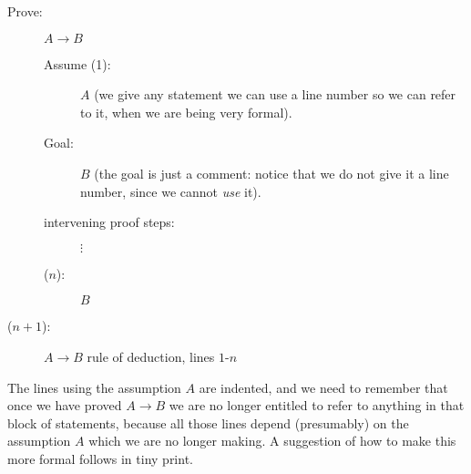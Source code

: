 \documentclass[12pt]{article}
\begin{document}
\begin{description}

\item[Prove:]  $A \rightarrow B$

\begin{description}

\item[Assume (1):]  $A$  (we give any statement we can use a line number so we can refer to it, when we are being very formal).

\item[Goal:]  $B$ (the goal is just a comment:  notice that we do not give it a line number, since we cannot {\em use\/} it).

\item[intervening proof steps:]  $\vdots$

\item[($n$):]  $B$

\end{description}

\item[($n+1$):]  $A \rightarrow B$ rule of deduction, lines $1$-$n$

\end{description}

The lines using the assumption $A$ are indented, and we need to remember that once we have proved $A \rightarrow B$ we are no longer entitled to refer to anything in that block of statements, because all those lines depend (presumably) on the assumption $A$ which we are no longer making.
\newpage
A suggestion of how to make this more formal follows in tiny print.
\end{document}
